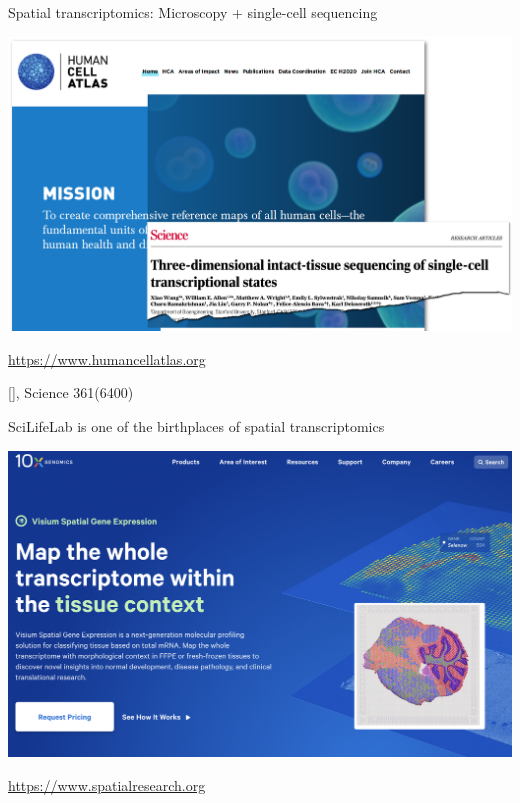 \documentclass[10pt]{beamer}
\newcommand{\credit}[1]{{\vspace{\fill} \par \raggedleft \scriptsize \mdseries \color{mDarkBrown} #1 \par}}
\newcommand{\citeme}[1]{{\xspace\color{scAqua} \scriptsize [\cite{#1}]}}
\begin{document}
\begin{frame}{Spatial transcriptomics: Microscopy + single-cell sequencing}
	\begin{center}
		\includegraphics[width=\textwidth]{./figures/hca.png} \\
	\end{center}
	\url{https://www.humancellatlas.org}
	\credit{\citeme{Wang2018}, Science 361(6400)}
\end{frame}

\begin{frame}{SciLifeLab is one of the birthplaces of spatial transcriptomics}
	\begin{center}
		\includegraphics[width=\textwidth]{./figures/visium10x.png} \\
	\end{center}
	\url{https://www.spatialresearch.org}
\end{frame}
\end{document}
